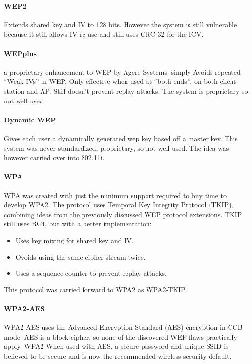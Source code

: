 \documentclass[pdftex, 11pt, a4paper]{article}
\begin{document}
\paragraph{WEP2}
Extends shared key and IV to 128 bits. However the system is still vulnerable because it still allows IV re-use and still uses CRC-32 for the ICV.
\paragraph{WEPplus} a proprietary enhancement to WEP by Agere Systems: simply Avoids repeated ``Weak IVs'' in WEP.  Only effective when used at ``both ends'', on both client station and AP. Still doesn't prevent replay attacks.
The system is proprietary so not well used.
\paragraph{Dynamic WEP}
Gives each user a dynamically generated wep key based off a master key. This system was never standardized, proprietary, so not well used. The idea was however carried over into 802.11i.

\paragraph{WPA}
WPA was created with just the minimum support required to buy time to develop WPA2. The protocol uses Temporal Key Integrity Protocol (TKIP), combining ideas from the previously discussed WEP protocol extensions. TKIP still uses RC4, but with a better implementation:

\begin{itemize}
\item Uses key mixing for shared key and IV.
\item Ovoids using the same cipher-stream twice.
\item Uses a sequence counter to prevent replay attacks.
\end{itemize}

This protocol was carried forward to WPA2 as WPA2-TKIP.

\paragraph{WPA2-AES}
WPA2-AES uses the Advanced Encryption Standard (AES) encryption in CCB mode.
AES is a block cipher, so none of the discovered WEP flaws practically apply. WPA2 When used with AES, a secure password and unique SSID is believed to be secure and is now the recommended wireless security default.
\end{document}
